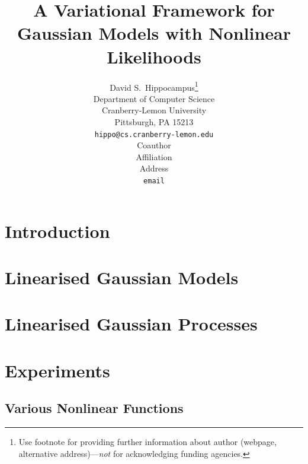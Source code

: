 \documentclass{article} %
\title{A Variational Framework for Gaussian Models with Nonlinear Likelihoods}
\author{
David S.~Hippocampus\thanks{Use footnote for providing further information
about author (webpage, alternative address)---\emph{not} for acknowledging
funding agencies.} \\
Department of Computer Science\\
Cranberry-Lemon University\\
Pittsburgh, PA 15213 \\
\texttt{hippo@cs.cranberry-lemon.edu} \\
\And
Coauthor \\
Affiliation \\
Address \\
\texttt{email} \\
}
\begin{document}
\maketitle

\begin{abstract}
\end{abstract}

\section{Introduction}

\section{Linearised Gaussian Models}

\section{Linearised Gaussian Processes}

\section{Experiments}


\subsection{Various Nonlinear Functions}
\end{document}
